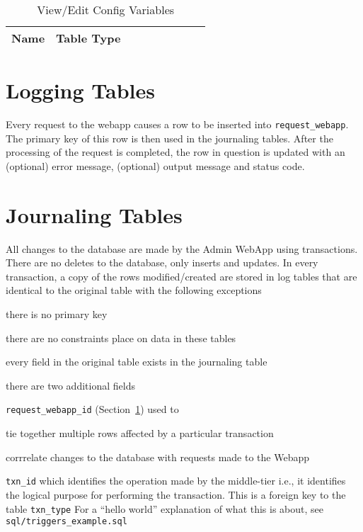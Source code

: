 \documentclass[letterpaper]{article}
\begin{document}
\begin{table}[hb]
\centering
\begin{tabular}{|l||l|l|l|l|l|l|l|l|}  \hline \hline
  {\bf Name } & {\bf Table Type} \\ \hline \hline

\hline
\end{tabular}
\caption{View/Edit Config Variables}
\label{tbl_config}
\end{table}

\section{Logging Tables}
\label{logging_tables}

Every request to the webapp causes a row to be inserted into
\verb+request_webapp+. The primary key of this row is then used in the
journaling tables. After the processing of the request is completed, the row in
question is updated with an (optional) error message, (optional) output message and status code.

\section{Journaling Tables}
\label{journaling_tables}

All changes to the database are made by the Admin WebApp using transactions.
There are no deletes to the database, only inserts and updates. 
In every transaction, a copy of the rows modified/created are stored in log
tables that are identical to the original table with the following exceptions
\be
\item there is no primary key
\item there are no constraints place on data in these tables
\item every field in the original table exists in the journaling table
\item there are two additional fields
  \be
\item \verb+request_webapp_id+ (Section~\ref{logging_tables}) used to 
  \be
\item tie together multiple rows affected by a particular transaction
\item corrrelate changes to the database with requests made to the Webapp
  \ee
\item \verb+txn_id+ which identifies the operation made by the middle-tier i.e.,
  it identifies the logical purpose for performing the transaction. This is a
  foreign key to the table \verb+txn_type+
  \ee
  \ee
For a ``hello world'' explanation of what this is about, see 
\verb+sql/triggers_example.sql+
\end{document}
